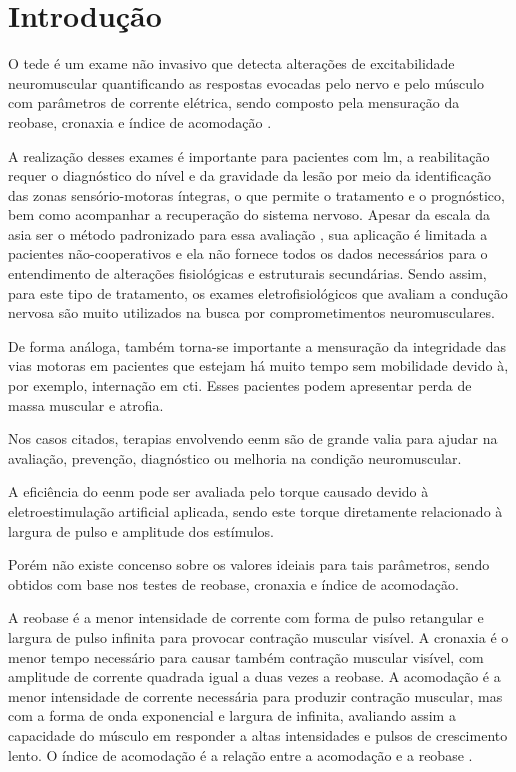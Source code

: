 \section{Introdução}

O \ac{tede} é um exame não invasivo que detecta alterações de excitabilidade neuromuscular quantificando as respostas evocadas pelo nervo e pelo músculo com parâmetros de corrente elétrica, sendo composto pela mensuração da reobase, cronaxia e índice de acomodação \cite{sluga2002,schuhfired2005,lee2013}.

A realização desses exames é importante para pacientes com \ac{lm}, a reabilitação requer o diagnóstico do nível e da gravidade da lesão por meio da identificação das zonas sensório-motoras íntegras, o que permite o tratamento e o prognóstico, bem como acompanhar a recuperação do sistema nervoso. Apesar da escala da \ac{asia} ser o método padronizado para essa avaliação \cite{van2011}, sua aplicação é limitada a pacientes não-cooperativos e ela não fornece todos os dados necessários para o entendimento de alterações fisiológicas e estruturais secundárias. Sendo assim, para este tipo de tratamento, os exames eletrofisiológicos que avaliam a condução nervosa são muito utilizados na busca por comprometimentos neuromusculares.

De forma análoga, também torna-se importante a mensuração da integridade das vias motoras em pacientes que estejam há muito tempo sem mobilidade devido à, por exemplo, internação em \ac{cti}. Esses pacientes podem apresentar perda de massa muscular e atrofia.

Nos casos citados, terapias envolvendo \ac{eenm} são de grande valia para ajudar na avaliação, prevenção, diagnóstico ou melhoria na condição neuromuscular.

A eficiência do \ac{eenm} pode ser avaliada pelo torque causado devido à eletroestimulação artificial aplicada, sendo este torque diretamente relacionado à largura de pulso e amplitude dos estímulos.

Porém não existe concenso sobre os valores ideiais para tais parâmetros, sendo obtidos com base nos testes de reobase, cronaxia e índice de acomodação. 

A reobase é a menor intensidade de corrente com forma de pulso retangular e largura de pulso infinita para provocar contração muscular visível. A cronaxia é o menor tempo necessário para causar também contração muscular visível, com amplitude de corrente quadrada igual a duas vezes a reobase. A acomodação é a menor intensidade de corrente necessária para produzir contração muscular, mas com a forma de onda exponencial e largura de infinita, avaliando assim a capacidade do músculo em responder a altas intensidades e pulsos de crescimento lento. O índice de acomodação é a relação entre a acomodação e a reobase \cite{sluga2002}.

